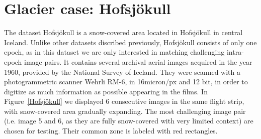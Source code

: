 \section{Glacier case: Hofsjökull}
The dataset Hofsjökull is a snow-covered area located in Hofsjökull in central Iceland. Unlike other datasets discribed previously, Hofsjökull consists of only one epoch, as in this dataset we are only interested in matching challenging intra-epoch image pairs. It contains several archival aerial images acquired in the year 1960, provided by the National Survey of Iceland. They were scanned with a photogrammetric scanner Wehrli RM-6, in 16micron/px and 12 bit, in order to digitize as much information as possible appearing in the films. In Figure~\ref{Hofsjökull} we displayed 6 consecutive images in the same flight strip, with snow-covered area gradually expanding. The most challenging image pair (i.e. image 5 and 6, as they are fully snow-covered with very limited context) are chosen for testing. Their common zone is labeled with red rectangles. 

